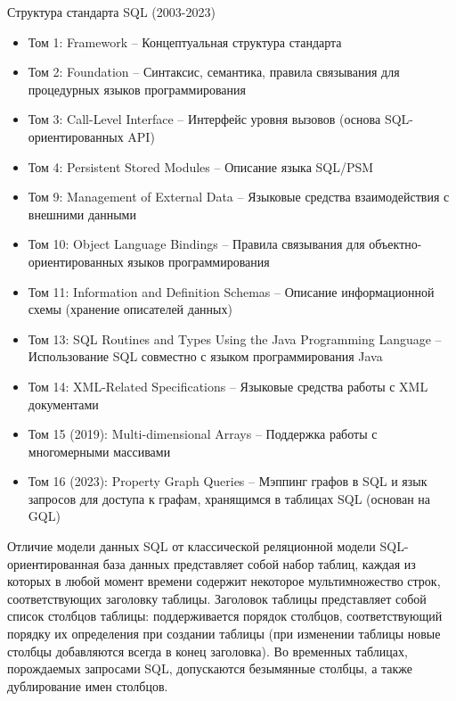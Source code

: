 \documentclass[a4paper,12pt]{article}
\begin{document}
Структура стандарта SQL (2003-2023)  
\begin{itemize}
\item Том 1: Framework – Концептуальная структура стандарта
\item Том 2: Foundation – Синтаксис, семантика, правила связывания для процедурных языков программирования
\item Том 3: Call-Level Interface – Интерфейс уровня вызовов (основа SQL-ориентированных API)
\item Том 4: Persistent Stored Modules – Описание языка SQL/PSM
\item Том 9: Management of External Data – Языковые средства взаимодействия с внешними данными
\item Том 10: Object Language Bindings – Правила связывания для объектно-ориентированных языков программирования
\item Том 11: Information and Definition Schemas – Описание информационной схемы (хранение описателей данных)
\item Том 13: SQL Routines and Types Using the Java Programming Language – Использование SQL совместно с языком программирования Java
\item Том 14: XML-Related Specifications – Языковые средства работы с XML документами
\item Том 15 (2019): Multi-dimensional Arrays – Поддержка работы с многомерными массивами
\item Том 16 (2023): Property Graph Queries – Мэппинг графов в SQL и язык запросов для доступа к графам, хранящимся в таблицах SQL (основан на GQL)
\end{itemize}

Отличие модели данных SQL от классической реляционной модели  
SQL-ориентированная база данных представляет собой набор таблиц, каждая из которых в любой момент времени содержит некоторое мультимножество строк, соответствующих заголовку таблицы. Заголовок таблицы представляет собой список столбцов таблицы: поддерживается порядок столбцов, соответствующий порядку их определения при создании таблицы (при изменении таблицы новые столбцы добавляются всегда в конец заголовка). Во временных таблицах, порождаемых запросами SQL, допускаются безымянные столбцы, а также дублирование имен столбцов.
\end{document}
